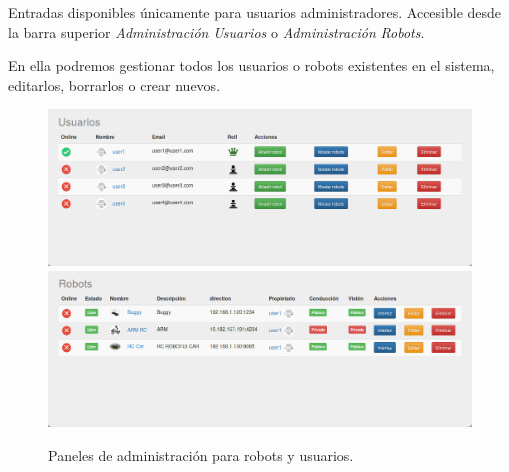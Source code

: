 Entradas disponibles únicamente para usuarios administradores. Accesible desde la barra superior \emph{Administración}  \textrightarrow \enspace  \emph{Usuarios} o \emph{Administración}  \textrightarrow \enspace  \emph{Robots}.

En ella podremos gestionar todos los usuarios o robots existentes en el sistema, editarlos, borrarlos o crear nuevos.\\

\begin{figure}[H]
    \centering
    \includegraphics[width=12.5cm]{imagenes/manual-usuario/administracion-usuarios.png}
    \qquad
    \includegraphics[width=12.5cm]{imagenes/manual-usuario/administracion-robots.png}
    \caption{Paneles de administración para robots y usuarios.}%
    \label{fig:http-request}%
\end{figure}
